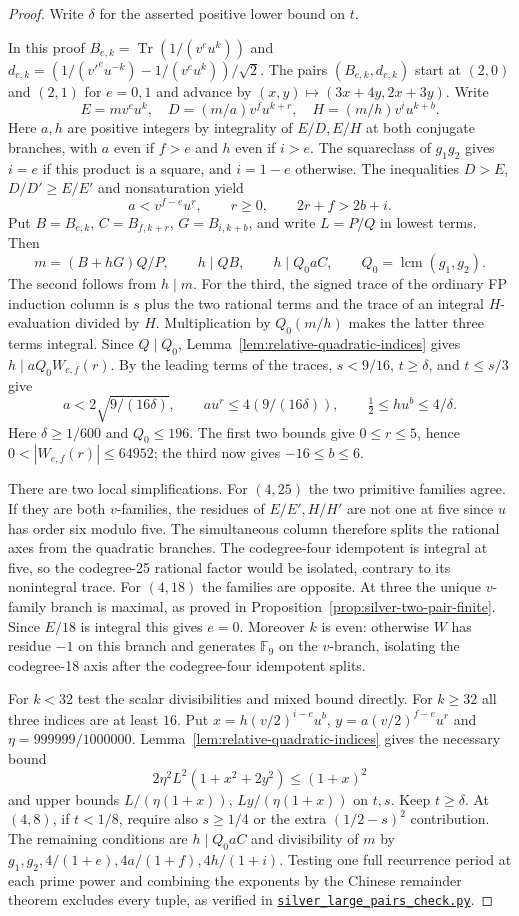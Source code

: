 \documentclass[11pt,reqno]{amsart}
\newcommand{\codefile}[1]{\href{https://github.com/sebastienpalcoux/grothendieck-ring-classification/blob/d5750105bb5758f3ad38d2e5464dfcc12c019816/supplements/rank6/sphericality/#1}{\nolinkurl{#1}}}
\theoremstyle{remark}\newtheorem{remark}[theorem]{Remark}
\numberwithin{equation}{section}
\begin{document}
\begin{proof}
Write $\delta$ for the asserted positive lower bound on $t$.

In this proof $B_{e,k}=\operatorname{Tr}(1/(v^e u^k))$ and
$d_{e,k}=(1/(v'^e u^{-k})-1/(v^e u^k))/\sqrt2$.
The pairs $(B_{e,k},d_{e,k})$ start at $(2,0)$ and $(2,1)$
for $e=0,1$ and advance by $(x,y)\mapsto(3x+4y,2x+3y)$.
Write
\[
 E=m v^e u^k,\quad D=(m/a)v^f u^{k+r},\quad
 H=(m/h)v^i u^{k+b}.
\]
Here $a,h$ are positive integers by integrality of $E/D,E/H$
at both conjugate branches, with $a$ even if $f>e$ and $h$ even
if $i>e$. The squareclass of $g_1g_2$ gives $i=e$ if this
product is a square, and $i=1-e$ otherwise.
The inequalities $D>E$, $D/D'\ge E/E'$ and nonsaturation yield
\[
  a<v^{f-e}u^r,\qquad r\ge0,\qquad 2r+f>2b+i .
\]
Put $B=B_{e,k}$, $C=B_{f,k+r}$, $G=B_{i,k+b}$, and write $L=P/Q$
in lowest terms. Then
\[
  m=(B+hG)Q/P,\qquad h\mid QB,\qquad h\mid Q_0aC,
  \qquad Q_0=\operatorname{lcm}(g_1,g_2).
\]
The second follows from $h\mid m$. For the third, the signed trace
of the ordinary FP induction column is $s$ plus the two rational
terms and the trace of an integral $H$-evaluation divided by $H$.
Multiplication by $Q_0(m/h)$ makes the latter three terms integral.
Since $Q\mid Q_0$, Lemma~\ref{lem:relative-quadratic-indices} gives
$h\mid aQ_0 W_{e,f}(r)$. By the leading terms of the traces,
$s<9/16$, $t\ge\delta$, and $t\le s/3$ give
\[
 a<2\sqrt{9/(16\delta)},\qquad au^r\le4(9/(16\delta)),\qquad
 \tfrac12\le hu^b\le4/\delta .
\]
Here $\delta\ge1/600$ and $Q_0\le196$. The first two bounds give
$0\le r\le5$, hence $0<|W_{e,f}(r)|\le64952$; the third now gives
$-16\le b\le6$.

There are two local simplifications. For $(4,25)$ the two primitive
families agree. If they are both $v$-families, the residues of
$E/E',H/H'$ are not one at five since $u$ has order six modulo
five. The simultaneous column therefore splits the rational axes
from the quadratic branches. The codegree-four idempotent is
integral at five, so the codegree-25 rational factor would be
isolated, contrary to its nonintegral trace. For $(4,18)$ the
families are opposite. At three the unique $v$-family branch is
maximal, as proved in Proposition~\ref{prop:silver-two-pair-finite}.
Since $E/18$ is integral this gives $e=0$. Moreover $k$ is even:
otherwise $W$ has residue $-1$ on this branch and generates
$\mathbb F_9$ on the $v$-branch, isolating the codegree-18 axis
after the codegree-four idempotent splits.

For $k<32$ test the scalar divisibilities and mixed bound directly.
For $k\ge32$ all three indices are at least $16$. Put
$x=h(v/2)^{i-e}u^b$, $y=a(v/2)^{f-e}u^r$ and $\eta=999999/1000000$.
Lemma~\ref{lem:relative-quadratic-indices} gives the necessary bound
\[
             2\eta^2L^2(1+x^2+2y^2)\le(1+x)^2
\]
and upper bounds $L/(\eta(1+x))$, $Ly/(\eta(1+x))$ on $t,s$.
Keep $t\ge\delta$. At $(4,8)$, if $t<1/8$, require also $s\ge1/4$
or the extra $(1/2-s)^2$ contribution. The remaining conditions are
$h\mid Q_0aC$ and divisibility of $m$ by
$g_1,g_2,4/(1+e),4a/(1+f),4h/(1+i)$.
Testing one full recurrence period at each prime power and combining
the exponents by the Chinese remainder theorem excludes every tuple,
as verified in \codefile{silver_large_pairs_check.py}.
\end{proof}
\end{document}
